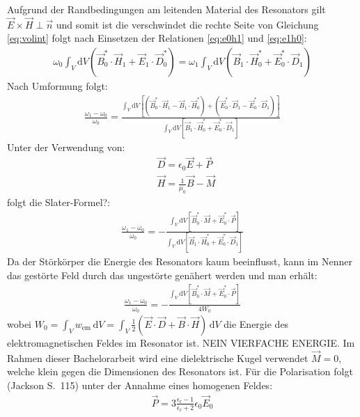 \documentclass[11pt, a4paper]{scrbook}
\newcommand{\ve}{\vec{E}}
\newcommand{\vb}{\vec{B}}
\newcommand{\vh}{\vec{H}}
\newcommand{\vd}{\vec{D}}
\begin{document}
	Aufgrund der Randbedingungen am leitenden Material des Resonators gilt $\ve \times \vh \perp \vec{n}$ und somit ist die verschwindet die rechte Seite von Gleichung \eqref{eq:volint} folgt nach Einsetzen der Relationen \eqref{eq:e0h1} und \eqref{eq:e1h0}:
	\begin{align}
		\omega_0 \int_{V} \mathrm{d}V \left( \vb_0^* \cdot \vh_1 + \ve_1 \cdot \vd_0^* \right) = \omega_1 \int_{V} \mathrm{d}V \left( \vb_1 \cdot \vh_0^* + \ve_0^* \cdot \vd_1 \right)
	\end{align}
	Nach Umformung folgt:
	\begin{align}
		\frac{\omega_1 - \omega_0}{\omega_0} = \frac{\int_{V} \mathrm{d}V \left[ \left( \vb_0^* \cdot \vh_1 - \vb_1 \cdot \vh_0^* \right) + \left( \ve_0^* \cdot \vd_1 - \ve_0^* \cdot \vd_1 \right)\right]}{\int_V \mathrm{d}V \left[ \vb_1 \cdot \vh_0^* + \ve_0^* \cdot \vd_1 \right] }
	\end{align}
	Unter der Verwendung von:
	\begin{subequations}
		\begin{align}
			&\vd = \epsilon_0 \ve + \vec{P} \\
			&\vh = \frac{1}{\mu_0} \vb - \vec{M}
		\end{align}
	\end{subequations}
	folgt die Slater-Formel?:
	\begin{align}
		\frac{\omega_1 - \omega_0}{\omega_0} = - \frac{\int_V \mathrm{d}V \left[ \vb_0^* \cdot \vec{M} + \ve_0^* \cdot \vec{P} \right]}{\int_V \mathrm{d}V \left[ \vb_1 \cdot \vh_0^* + \ve_0^* \cdot \vd_1 \right]}
	\end{align}
	Da der Störkörper die Energie des Resonators kaum beeinflusst, kann im Nenner das gestörte Feld durch das ungestörte genähert werden und man erhält:
	\begin{align}
		\frac{\omega_1 - \omega_0}{\omega_0} = - \frac{\int_V \mathrm{d}V \left[ \vb_0^* \cdot \vec{M} + \ve_0^* \cdot \vec{P} \right]}{4 W_0}
	\end{align}
	wobei $W_0 = \int_V w_\mathrm{em} \, \mathrm{d}V = \int_V \frac{1}{2} (\ve \cdot \vd + \vb \cdot \vh) \, \mathrm{d}V$ die Energie des elektromagnetischen Feldes im Resonator ist. NEIN VIERFACHE ENERGIE.
	Im Rahmen dieser Bachelorarbeit wird eine dielektrische Kugel verwendet $\vec{M} = 0$, welche klein gegen die Dimensionen des Resonators ist. Für die Polarisation folgt (Jackson S.\ 115) unter der Annahme eines homogenen Feldes:
	\begin{align}
		\vec{P} = 3 \frac{\epsilon_\mathrm{r} - 1}{\epsilon_\mathrm{r} + 2} \epsilon_0 \ve_0
	\end{align}
\end{document}

